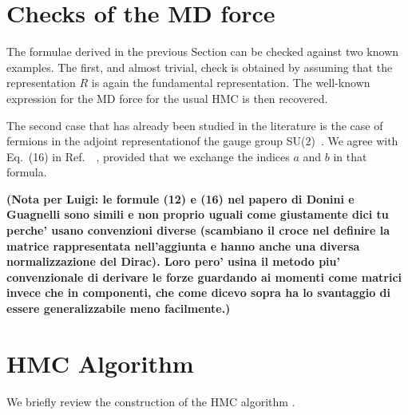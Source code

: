 \documentclass{article}[12pt]
\begin{document}
\section{Checks of the MD force}
The formulae derived in the previous Section can be checked against two
known examples. The first, and almost trivial, check is obtained by
assuming that the representation $R$ is again the fundamental
representation. The well-known expression for the MD force for the
usual HMC is then recovered. 

The second case that has already been studied in the literature is the
case of fermions in the adjoint representationof the gauge group
SU($2$)~\cite{Donini:1996nr}. We agree with Eq.~(16) in
Ref.~~\cite{Donini:1996nr}, provided that we exchange the indices $a$
and $b$ in that formula.

\noindent\textbf{(Nota per Luigi: le formule (12) e (16) nel papero di Donini e Guagnelli sono
		simili e non proprio uguali come giustamente dici tu perche' usano convenzioni diverse (scambiano il croce nel definire 
			la matrice rappresentata nell'aggiunta e hanno anche una diversa normalizzazione del Dirac). Loro pero'
		usina il metodo piu' convenzionale di derivare le forze guardando ai momenti come matrici invece che in componenti, che
		come dicevo sopra ha lo svantaggio di essere generalizzabile meno facilmente.)}


\section{HMC Algorithm}

We briefly review the construction of the HMC algorithm \cite{??}.
\end{document}
